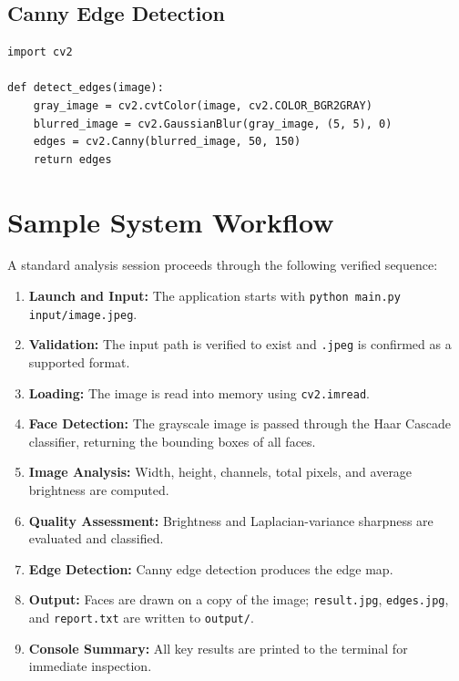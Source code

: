 \documentclass[11pt,a4paper]{article}
\begin{document}
\subsection{Canny Edge Detection}
\begin{lstlisting}[caption={Edge Detection in edge\_detector.py}]
import cv2

def detect_edges(image):
    gray_image = cv2.cvtColor(image, cv2.COLOR_BGR2GRAY)
    blurred_image = cv2.GaussianBlur(gray_image, (5, 5), 0)
    edges = cv2.Canny(blurred_image, 50, 150)
    return edges
\end{lstlisting}

\section{Sample System Workflow}
A standard analysis session proceeds through the following verified sequence:
\begin{enumerate}[leftmargin=1.5em]
    \item \textbf{Launch and Input:} The application starts with \texttt{python main.py input/image.jpeg}.
    \item \textbf{Validation:} The input path is verified to exist and \texttt{.jpeg} is confirmed as a supported format.
    \item \textbf{Loading:} The image is read into memory using \texttt{cv2.imread}.
    \item \textbf{Face Detection:} The grayscale image is passed through the Haar Cascade classifier, returning the bounding boxes of all faces.
    \item \textbf{Image Analysis:} Width, height, channels, total pixels, and average brightness are computed.
    \item \textbf{Quality Assessment:} Brightness and Laplacian-variance sharpness are evaluated and classified.
    \item \textbf{Edge Detection:} Canny edge detection produces the edge map.
    \item \textbf{Output:} Faces are drawn on a copy of the image; \texttt{result.jpg}, \texttt{edges.jpg}, and \texttt{report.txt} are written to \texttt{output/}.
    \item \textbf{Console Summary:} All key results are printed to the terminal for immediate inspection.
\end{enumerate}
\end{document}
